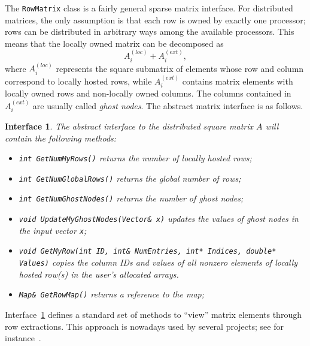 \documentclass[acmtocl]{acmtrans2m}
\newtheorem{interface}{Interface}[section]
\begin{document}
The {\tt RowMatrix} class is a fairly general sparse matrix interface. For
distributed matrices, the only assumption is that each row is owned by exactly
one processor; rows can be distributed in arbitrary ways among the available
processors. This means that the locally owned matrix can be decomposed as
\begin{equation}
A^{(loc)}_i + A^{(ext)}_i,
\end{equation}
where $A^{(loc)}_i$ represents the square submatrix of elements whose row
and column correspond to locally hosted rows, while
$A^{(ext)}_i$ contains matrix elements with locally owned rows and
non-locally owned columns. The
columns contained in $A_i^{(ext)}$ are usually called {\sl ghost nodes}.
The abstract matrix interface is as
follows.
\begin{interface}
\label{int:ami}
The abstract interface to the distributed square matrix $A$
will contain the following methods:
\begin{itemize}
\item \verb!int GetNumMyRows()! returns the number of locally hosted rows;
\item \verb!int GetNumGlobalRows()! returns the global number of rows;
\item \verb!int GetNumGhostNodes()! returns the number of ghost nodes;
\item \verb!void UpdateMyGhostNodes(Vector& x)! updates the values of ghost nodes
 in the input vector {\tt x};
\item {\tt void GetMyRow(int ID, int\& NumEntries, int* Indices, double*
                             Values)} copies the
column IDs and values of all nonzero elements of locally hosted row(s) 
in the user's allocated arrays.
\item \verb!Map& GetRowMap()! returns a reference to the map;
\end{itemize}
\end{interface}
Interface~\ref{int:ami} defines a standard set of methods to ``view'' matrix
elements through row extractions. This approach is nowadays used  by several
projects; see for instance~\cite{Epetra-Ref-Guide,ml-guide,lujan00oolala}.

\smallskip
\end{document}
